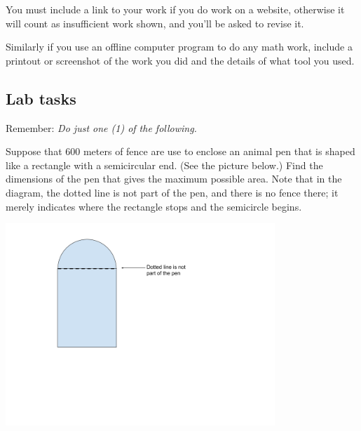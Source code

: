 \documentclass[11pt,letterpaper]{article}
\newenvironment{problem}[2][Problem]{\begin{trivlist}
\item[\hskip \labelsep {\bfseries #1}\hskip \labelsep {\bfseries #2.}]}{\end{trivlist}}
\begin{document}
You must include a link to your work if you do work on a website, otherwise it will count as insufficient work shown, and you'll be asked to revise it. 

Similarly if you use an offline computer program to do any math work, include a printout or screenshot of the work you did and the details of what tool you used. 


\subsection*{Lab tasks}

Remember: \emph{Do just one (1) of the following.} 

\begin{problem}{1}
Suppose that 600 meters of fence are use to enclose an animal pen that is shaped like a rectangle with a semicircular end. (See the picture below.) Find the dimensions of the pen that gives the maximum possible area. Note that in the diagram, the dotted line is not part of the pen, and there is no fence there; it merely indicates where the rectangle stops and the semicircle begins. 
\begin{center}
    \includegraphics[width=4in]{l7p1.png}
\end{center}


\end{problem}
\end{document}
